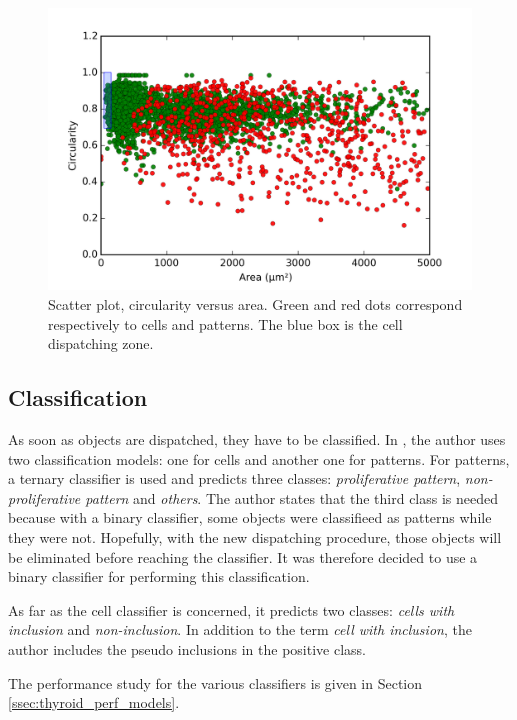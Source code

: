 \begin{figure}
	\center
	\includegraphics[scale=0.75]{image/scatter_cells_patterns_0_5000.png}
	\caption{Scatter plot, circularity versus area. Green and red dots correspond respectively to cells and patterns. The blue box is the cell dispatching zone.}
	\label{fig:scatter_area_circ_cell_vs_pattern}
\end{figure}

\subsection{Classification}

As soon as objects are dispatched, they have to be classified. In \cite{adeblire2013}, the author uses two classification models: one for cells and another one for patterns. For patterns, a ternary classifier is used and predicts three classes: \textit{proliferative pattern}, \textit{non-proliferative pattern} and \textit{others}. The author states that the third class is needed because with a binary classifier, some objects were classifieed as patterns while they were not. Hopefully, with the new dispatching procedure, those objects will be eliminated before reaching the classifier. It was therefore decided to use a binary classifier for performing this classification. 

As far as the cell classifier is concerned, it predicts two classes: \textit{cells with inclusion} and \textit{non-inclusion}. In addition to the term \textit{cell with inclusion}, the author includes the pseudo inclusions in the positive class. 

The performance study for the various classifiers is given in Section \ref{ssec:thyroid_perf_models}.

